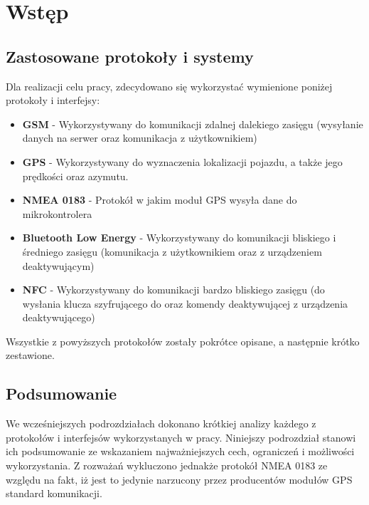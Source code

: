 \chapter{Wstęp}
\label{teorethical_introduction}

\section{Zastosowane protokoły i systemy}
Dla realizacji celu pracy, zdecydowano się wykorzystać wymienione poniżej protokoły i interfejsy:
\begin{itemize}
	\item \textbf{GSM} - Wykorzystywany do komunikacji zdalnej dalekiego zasięgu (wysyłanie danych na serwer oraz komunikacja z użytkownikiem)
	\item \textbf{GPS} - Wykorzystywany do wyznaczenia lokalizacji pojazdu, a także jego prędkości oraz azymutu.
	
	\item \textbf{NMEA 0183} - Protokół w jakim moduł GPS wysyła dane do mikrokontrolera
	\item \textbf{Bluetooth Low Energy} - Wykorzystywany do komunikacji bliskiego i średniego zasięgu (komunikacja z użytkownikiem oraz z urządzeniem deaktywującym)
	\item \textbf{NFC} - Wykorzystywany do komunikacji bardzo bliskiego zasięgu (do wysłania klucza szyfrującego do oraz komendy deaktywującej z urządzenia deaktywującego)
\end{itemize}

Wszystkie z powyższych protokołów zostały pokrótce opisane, a następnie krótko zestawione.

\clearpage











\clearpage
\section{Podsumowanie}

We wcześniejszych podrozdziałach dokonano krótkiej analizy każdego z protokołów i interfejsów wykorzystanych w pracy. Niniejszy podrozdział stanowi ich podsumowanie ze wskazaniem najważniejszych cech, ograniczeń i możliwości wykorzystania. Z rozważań wykluczono jednakże protokół NMEA 0183 ze względu na fakt, iż jest to jedynie narzucony przez producentów modułów GPS standard komunikacji.

